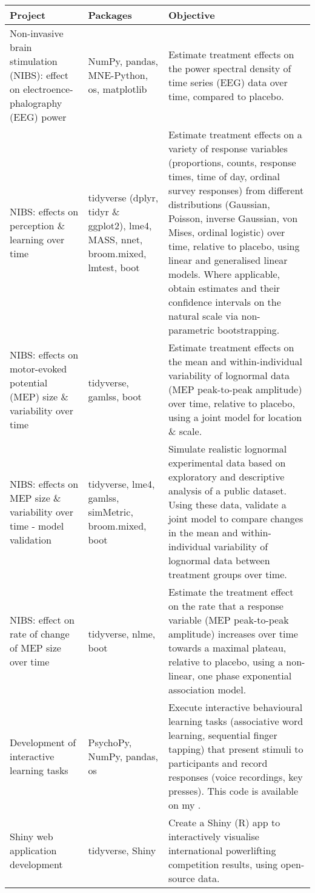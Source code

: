\begin{longtable}{>{\raggedright\arraybackslash}p{5.5cm} >{\raggedright\arraybackslash}p{3.3cm} p{9cm}}	
	\textbf{Project} & \textbf{Packages} & \textbf{Objective}\\
	\midrule
	\endhead
	Non-invasive brain stimulation (NIBS): effect on electroence- phalography (EEG) power 
	& NumPy, pandas, MNE-Python, os, matplotlib 
	& Estimate treatment effects on the power spectral density of time series (EEG) data over time, compared to placebo.\\
	\addlinespace
	NIBS: effects on perception \& learning over time 
	& tidyverse (dplyr, tidyr \& ggplot2), lme4, MASS, nnet, broom.mixed, lmtest, boot
	& Estimate treatment effects on a variety of response variables (proportions, counts, response times, time of day, ordinal survey responses) 
	from different distributions (Gaussian, Poisson, inverse Gaussian, von Mises, ordinal logistic) over time, relative to placebo, 
	using linear and generalised linear models. Where applicable, obtain estimates and their confidence intervals on the natural scale via non-parametric bootstrapping. \\
	\addlinespace
	NIBS: effects on motor-evoked potential (MEP) size \& variability over time
	& tidyverse, gamlss, boot 
	& Estimate treatment effects on the mean and within-individual variability of lognormal data (MEP peak-to-peak amplitude) over time, relative to placebo, 
	using a joint model for location \& scale.\\
	\addlinespace
	NIBS: effects on MEP size \& variability over time - model validation 
	& tidyverse, lme4, gamlss, simMetric, broom.mixed, boot 
	& Simulate realistic lognormal experimental data based on exploratory and descriptive analysis of a public dataset. 
	Using these data, validate a joint model to compare changes in the mean and within-individual variability of lognormal data between treatment groups over time.\\
	\addlinespace
	NIBS: effect on rate of change of MEP size over time
	& tidyverse, nlme, boot 
	& Estimate the treatment effect on the rate that a response variable (MEP peak-to-peak amplitude) increases over time towards a maximal plateau, 
	relative to placebo, using a non-linear, one phase exponential association model. \\
	\addlinespace
	Development of interactive learning tasks
	& PsychoPy, NumPy, pandas, os 
	& Execute interactive behavioural learning tasks (associative word learning, sequential finger tapping) that present stimuli to participants and record responses (voice recordings, key presses). 
	This code is available on my \htmltextcol{\href{https://github.com/jrwood21/sleep_tacs_study_jw_gh}{GitHub}}.\\
	\addlinespace
	Shiny web application development
	& tidyverse, Shiny 
	& Create a Shiny (R) app to interactively visualise international powerlifting competition results, using open-source data.\\
\end{longtable}
